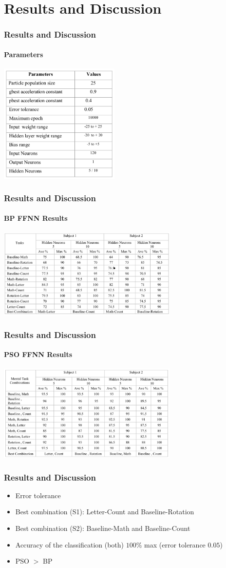 \section{Results and Discussion}

\frame
{
\frametitle{Results and Discussion}
\framesubtitle{Parameters}
\begin{center}
	\includegraphics[width=6cm]{img/table1}
\end{center}
}

\frame
{
\frametitle{Results and Discussion}
\framesubtitle{BP FFNN Results}
\begin{center}
	\includegraphics[width=9cm]{img/table3}
\end{center}
}

\frame
{
\frametitle{Results and Discussion}
\framesubtitle{PSO FFNN Results}
\begin{center}
	\includegraphics[width=9cm]{img/table2}
\end{center}
}

\frame
{
\frametitle{Results and Discussion}
\begin{itemize}
	\item Error tolerance
	\item Best combination (S1): Letter-Count and Baseline-Rotation
	\item Best combination (S2): Baseline-Math and Baseline-Count
	\item Accuracy of the classification (both) $100\%$ max (error tolerance $0.05$)
	\item PSO $>$ BP
\end{itemize}

}

